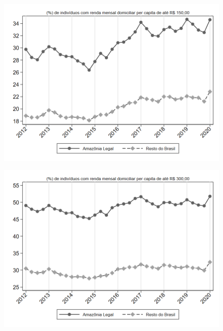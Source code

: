 \begin{frame}[label=_estrutura_renda_prop_rendimento_domiciliar_150]{}
\textit{\hyperlink{_estrutura_renda}{}}
\begin{figure}
  \centering
  \includegraphics[width=1.0\linewidth]{../../analysis/output/estrutura_renda/_estrutura_renda_prop_rendimento_domiciliar_150.png}
  \caption{}
  \label{fig:_estrutura_renda_prop_rendimento_domiciliar_150}
\end{figure}
\end{frame}

\begin{frame}[label=_estrutura_renda_prop_rendimento_domiciliar_300]{}
\textit{\hyperlink{_estrutura_renda}{}}
\begin{figure}
  \centering
  \includegraphics[width=1.0\linewidth]{../../analysis/output/estrutura_renda/_estrutura_renda_prop_rendimento_domiciliar_300.png}
  \caption{}
  \label{fig:_estrutura_renda_prop_rendimento_domiciliar_300}
\end{figure}
\end{frame}

